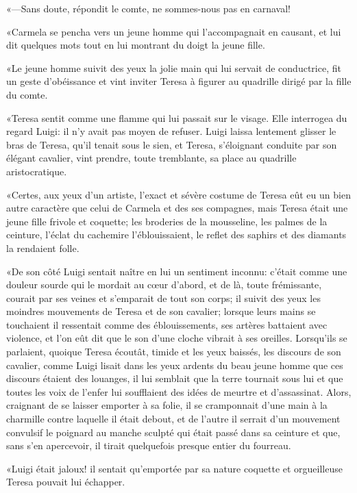 «—Sans doute, répondit le comte, ne sommes-nous pas en carnaval!  

«Carmela se pencha vers un jeune homme qui l'accompagnait en causant, et lui dit quelques mots tout en lui montrant du doigt la jeune fille. 

«Le jeune homme suivit des yeux la jolie main qui lui servait de conductrice, fit un geste d'obéissance et vint inviter Teresa à figurer au quadrille dirigé par la fille du comte. 

«Teresa sentit comme une flamme qui lui passait sur le visage. Elle interrogea du regard Luigi: il n'y avait pas moyen de refuser. Luigi laissa lentement glisser le bras de Teresa, qu'il tenait sous le sien, et Teresa, s'éloignant conduite par son élégant cavalier, vint prendre, toute tremblante, sa place au quadrille aristocratique.  

«Certes, aux yeux d'un artiste, l'exact et sévère costume de Teresa eût eu un bien autre caractère que celui de Carmela et des ses compagnes, mais Teresa était une jeune fille frivole et coquette; les broderies de la mousseline, les palmes de la ceinture, l'éclat du cachemire l'éblouissaient, le reflet des saphirs et des diamants la rendaient folle. 

«De son côté Luigi sentait naître en lui un sentiment inconnu: c'était comme une douleur sourde qui le mordait au cœur d'abord, et de là, toute frémissante, courait par ses veines et s'emparait de tout son corps; il suivit des yeux les moindres mouvements de Teresa et de son cavalier; lorsque leurs mains se touchaient il ressentait comme des éblouissements, ses artères battaient avec violence, et l'on eût dit que le son d'une cloche vibrait à ses oreilles. Lorsqu'ils se parlaient, quoique Teresa écoutât, timide et les yeux baissés, les discours de son cavalier, comme Luigi lisait dans les yeux ardents du beau jeune homme que ces discours étaient des louanges, il lui semblait que la terre tournait sous lui et que toutes les voix de l'enfer lui soufflaient des idées de meurtre et d'assassinat. Alors, craignant de se laisser emporter à sa folie, il se cramponnait d'une main à la charmille contre laquelle il était debout, et de l'autre il serrait d'un mouvement convulsif le poignard au manche sculpté qui était passé dans sa ceinture et que, sans s'en apercevoir, il tirait quelquefois presque entier du fourreau. 

«Luigi était jaloux! il sentait qu'emportée par sa nature coquette et orgueilleuse Teresa pouvait lui échapper.  

